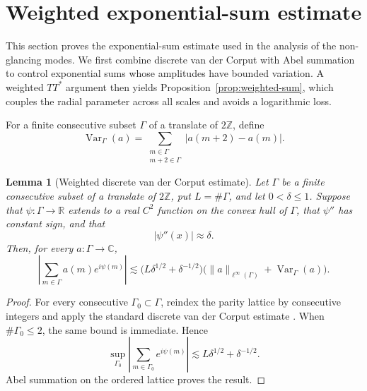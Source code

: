 \documentclass[11pt,a4paper]{amsart}
\newtheorem{lemma}[theorem]{Lemma}
\numberwithin{equation}{section}
\newcommand{\norm}[1]{\lVert #1\rVert}
\begin{document}
\section{Weighted exponential-sum estimate}\label{sec:weighted}

This section proves the exponential-sum estimate used in the analysis of the
non-glancing modes. We first combine discrete van der Corput with Abel
summation to control exponential sums whose amplitudes have bounded variation.
A weighted $TT^*$ argument then yields Proposition~\ref{prop:weighted-sum},
which couples the radial parameter across all scales and avoids a logarithmic
loss. 

For a finite consecutive
subset \(\Gamma\) of a translate of \(2\mathbb Z\), define
\[
 \operatorname{Var}_\Gamma(a)
 =\sum_{\substack{m\in\Gamma\\m+2\in\Gamma}}|a(m+2)-a(m)|.
\]

\begin{lemma}[Weighted discrete van der Corput estimate]
\label{lem:discrete-vdc}
Let \(\Gamma\) be a finite consecutive subset of a translate of
\(2\mathbb Z\), put \(L=\#\Gamma\), and let \(0<\delta\le1\). Suppose that
\(\psi:\Gamma\to\mathbb R\) extends to a real \(C^2\) function on the convex
hull of \(\Gamma\), that \(\psi''\) has constant sign, and that
\[
 |\psi''(x)|\approx\delta.
\]
Then, for every \(a:\Gamma\to\mathbb C\),
\[
 \left|\sum_{m\in\Gamma}a(m)e^{i\psi(m)}\right|
 \lesssim\bigl(L\delta^{1/2}+\delta^{-1/2}\bigr)
 \bigl(\norm a_{\ell^\infty(\Gamma)}+\operatorname{Var}_\Gamma(a)\bigr).
\]
\end{lemma}

\begin{proof}
For every consecutive \(\Gamma_0\subset\Gamma\), reindex the parity lattice by
consecutive integers and apply the standard discrete van der Corput estimate
\cite[Chapter~2, Theorem~2.2]{GrahamKolesnik}. When
\(\#\Gamma_0\le2\), the same bound is immediate. Hence
\[
 \sup_{\Gamma_0}
 \left|\sum_{m\in\Gamma_0}e^{i\psi(m)}\right|
 \lesssim L\delta^{1/2}+\delta^{-1/2}.
\]
Abel summation on the ordered lattice proves the result.
\end{proof}
\end{document}
